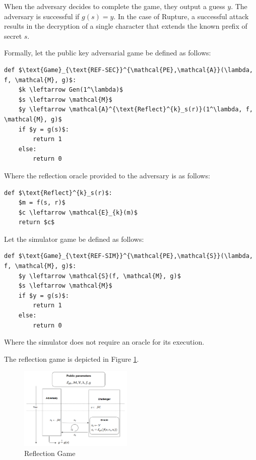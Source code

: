 When the adversary decides to complete the game, they output a guess $y$. The
adversary is successful if $g(s) = y$. In the case of Rupture, a successful
attack results in the decryption of a single character that extends the known
prefix of secret $s$.

Formally, let the public key adversarial game be defined as follows:

\begin{lstlisting}[texcl,mathescape,basicstyle=\small]
def $\text{Game}_{\text{REF-SEC}}^{\mathcal{PE},\mathcal{A}}(\lambda, f, \mathcal{M}, g)$:
    $k \leftarrow Gen(1^\lambda)$
    $s \leftarrow \mathcal{M}$
    $y \leftarrow \mathcal{A}^{\text{Reflect}^{k}_s(r)}(1^\lambda, f, \mathcal{M}, g)$
    if $y = g(s)$:
        return 1
    else:
        return 0
\end{lstlisting}

Where the reflection oracle provided to the adversary is as follows:

\begin{lstlisting}[texcl,mathescape,basicstyle=\small]
def $\text{Reflect}^{k}_s(r)$:
    $m = f(s, r)$
    $c \leftarrow \mathcal{E}_{k}(m)$
    return $c$
\end{lstlisting}

Let the simulator game be defined as follows:

\begin{lstlisting}[texcl,mathescape,basicstyle=\small]
def $\text{Game}_{\text{REF-SIM}}^{\mathcal{PE},\mathcal{S}}(\lambda, f, \mathcal{M}, g)$:
    $y \leftarrow \mathcal{S}(f, \mathcal{M}, g)$
    $s \leftarrow \mathcal{M}$
    if $y = g(s)$:
        return 1
    else:
        return 0
\end{lstlisting}

Where the simulator does not require an oracle for its execution.

The reflection game is depicted in Figure \ref{fig:refgame}.

    \begin{figure}[thpb]
        \centering
            \includegraphics[width=0.48\textwidth]{figures/reflection_game.png}
        \caption{Reflection Game}
        \label{fig:refgame}
    \end{figure}

